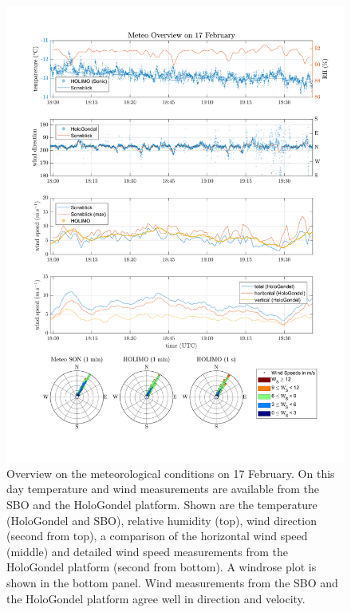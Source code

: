 \documentclass[draft,linenumbers]{agujournal}
\begin{document}
{\begin{figure}[h]
 \centering
 	\includegraphics[width=14cm]{MeteoOverview_1702.png}
 \caption{Overview on the meteorological conditions on 17 February. On this day temperature and wind measurements are available from the SBO and the HoloGondel platform. Shown are the temperature (HoloGondel and SBO), relative humidity (top), wind direction (second from top), a comparison of the horizontal wind speed (middle) and detailed wind speed measurements from the HoloGondel platform (second from bottom). A windrose plot is shown in the bottom panel. Wind measurements from the SBO and the HoloGondel platform agree well in direction and velocity.}
 \label{fig:meteo1702}
\end{figure}

}
\end{document}

